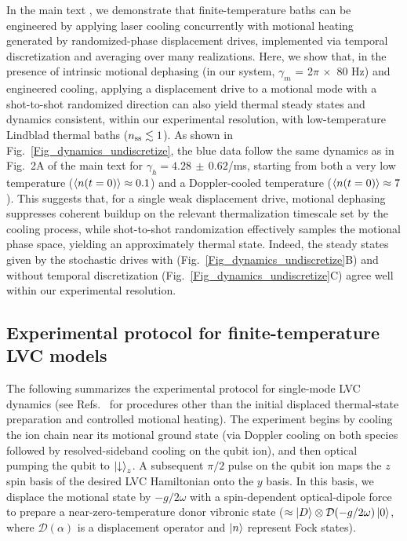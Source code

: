 \documentclass[%
reprint,
superscriptaddress,
amsmath,amssymb,
aps,
prl,
floatfix,
]{revtex4-2}
\begin{document}
In the main text \cite{so2025fT}, we demonstrate that finite-temperature baths can be engineered by applying laser cooling concurrently with motional heating generated by randomized-phase displacement drives, implemented via temporal discretization and averaging over many realizations. Here, we show that, in the presence of intrinsic motional dephasing (in our system, $\gamma_m $ = 2$\pi\,\times$ 80 Hz) and engineered cooling, applying a displacement drive to a motional mode with a shot-to-shot randomized direction can also yield thermal steady states and dynamics consistent, within our experimental resolution, with low-temperature Lindblad thermal baths ($n_{\rm ss}\lesssim1$). As shown in Fig.~\ref{Fig_dynamics_undiscretize}, the blue data follow the same dynamics as in Fig.~2A of the main text \cite{so2025fT} for $\gamma_h=4.28\,\pm\,0.62$/ms, starting from both a very low temperature ($\braket{n(t=0)}\approx 0.1$) and a Doppler-cooled temperature ($\braket{n(t=0)}\approx 7$). This suggests that, for a single weak displacement drive, motional dephasing suppresses coherent buildup on the relevant thermalization timescale set by the cooling process, while shot-to-shot randomization effectively samples the motional phase space, yielding an approximately thermal state. Indeed, the steady states given by the stochastic drives with (Fig.~\ref{Fig_dynamics_undiscretize}B) and without temporal discretization (Fig.~\ref{Fig_dynamics_undiscretize}C) agree well within our experimental resolution.

\subsection*{Experimental protocol for finite-temperature LVC models}

The following summarizes the experimental protocol for single-mode LVC dynamics (see Refs.~\cite{so2024electrontransfer,so2025multimode} for procedures other than the initial displaced thermal-state preparation and controlled motional heating). The experiment begins by cooling the ion chain near its motional ground state (via Doppler cooling on both species followed by resolved-sideband cooling on the qubit ion), and then optical pumping the qubit to $\ket{\downarrow}_z$. A subsequent $\pi/2$ pulse on the qubit ion maps the $z$ spin basis of the desired LVC Hamiltonian onto the $y$ basis. In this basis, we displace the motional state by $-g/2\omega$ with a spin-dependent optical-dipole force to prepare a near-zero-temperature donor vibronic state ($\approx \ket{D}\otimes\mathcal{D}(-g/2\omega)\ket{0}$, where $\mathcal{D}(\alpha)$ is a displacement operator and $\ket{n}$ represent Fock states).
 
\end{document}

